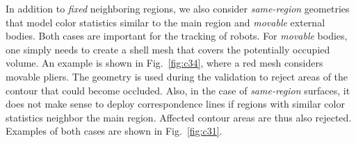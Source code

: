 \documentclass[letterpaper, 10 pt, conference]{ieeeconf}
\begin{document}
In addition to \textit{fixed} neighboring regions, we also consider \textit{same-region} geometries that model color statistics similar to the main region and \textit{movable} external bodies.
Both cases are important for the tracking of robots.
For \textit{movable} bodies, one simply needs to create a shell mesh that covers the potentially occupied volume.
An example is shown in Fig.~\ref{fig:c34}, where a red mesh considers movable pliers.
The geometry is used during the validation to reject areas of the contour that could become occluded.
Also, in the case of \textit{same-region} surfaces, it does not make sense to deploy correspondence lines if regions with similar color statistics neighbor the main region.
Affected contour areas are thus also rejected.
Examples of both cases are shown in Fig.~\ref{fig:c31}.
\begin{figure}[t]
	\centering

\end{figure}
\end{document}

